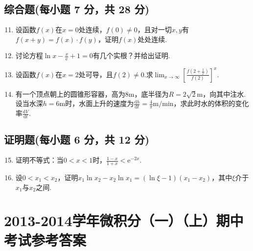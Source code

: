 \documentclass[../Main.tex]{subfiles}
\begin{document}
\section{综合题(每小题 7 分，共 28 分)}
\begin{enumerate}
    \setcounter{enumi}{10}
    \item 设函数$f(x)$在$x=0$处连续，$f(0)\neq0$，且对一切$x,y$有$f(x+y)=f(x
              )\cdot f(y)$，证明$f(x)$处处连续.
          \vspace{13em}

    \item 讨论方程$\ln x-\frac{x}{\mathrm{e}}+1=0$有几个实根？并给出证明.
          \vspace{12em}

    \item 设函数$f(x)$在$x=2$处可导，且$f(2)\neq0$.求$\lim_{x\to\infty}\left
              [\frac{f\left(2+\frac{1}{x}\right)}{f(2)}\right]^{x}$.
          \vspace{12em}

    \item 有一个顶点朝上的圆锥形容器，高为$8\mathrm{m}$，底半径为$R=2\sqrt{2}
              \mathrm{m}$，向其中注水.设当水深$h=6\mathrm{m}$时，水面上升的速度为$\frac{\mathrm{d}h}{\mathrm{d}t}
              =\frac{4}{\pi}\mathrm{m/min}$，求此时水的体积的变化率$\frac{\mathrm{d}V}{\mathrm{d}t}$.
          \vspace{11em}
\end{enumerate}

\section{证明题(每小题 6 分，共 12 分)}
\begin{enumerate}
    \setcounter{enumi}{14}
    \item 证明不等式：当$0<x<1$时，$\frac{1-x}{1+x}<\mathrm{e}^{-2x}$.
          \vspace{12em}

    \item 设$0<x_{1}<x_{2}$，证明$x_{1}\ln x_{2}-x_{2}\ln x_{1}=(\ln\xi-1)(x
                  _{1}-x_{2})$，其中$\xi$介于$x_{1}$与$x_{2}$之间.
          \vspace{12em}
\end{enumerate}

\chapter{2013-2014学年微积分（一）（上）期中考试参考答案}
\end{document}
